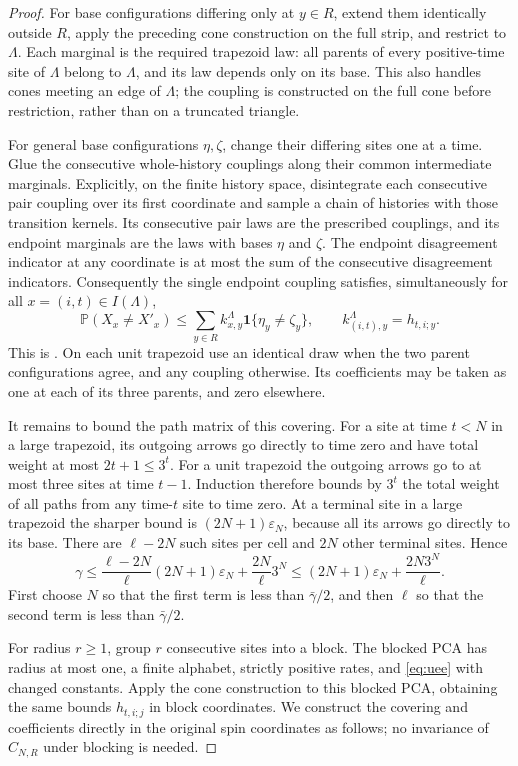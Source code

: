 \documentclass[11pt]{article}
\theoremstyle{plain}
\theoremstyle{definition}
\theoremstyle{remark}
\newcommand{\Prob}{\mathbb{P}}
\begin{document}
\begin{proof}
For base configurations differing only at $y\in R$, extend them identically outside $R$, apply the preceding cone construction on the full strip, and restrict to $\Lambda$. Each marginal is the required trapezoid law: all parents of every positive-time site of $\Lambda$ belong to $\Lambda$, and its law depends only on its base. This also handles cones meeting an edge of $\Lambda$; the coupling is constructed on the full cone before restriction, rather than on a truncated triangle.

For general base configurations $\eta,\zeta$, change their differing sites one at a time. Glue the consecutive whole-history couplings along their common intermediate marginals. Explicitly, on the finite history space, disintegrate each consecutive pair coupling over its first coordinate and sample a chain of histories with those transition kernels. Its consecutive pair laws are the prescribed couplings, and its endpoint marginals are the laws with bases $\eta$ and $\zeta$. The endpoint disagreement indicator at any coordinate is at most the sum of the consecutive disagreement indicators. Consequently the single endpoint coupling satisfies, simultaneously for all $x=(i,t)\in I(\Lambda)$,
\[
 \Prob(X_x\ne X'_x)
 \le\sum_{y\in R}k^\Lambda_{x,y}
             \mathbf1\{\eta_y\ne\zeta_y\},
 \qquad k^\Lambda_{(i,t),y}=h_{t,i;y}.
\]
This is \cite[eq.~(3-3)]{MS91}. On each unit trapezoid use an identical draw when the two parent configurations agree, and any coupling otherwise. Its coefficients may be taken as one at each of its three parents, and zero elsewhere.

It remains to bound the path matrix of this covering. For a site at time $t<N$ in a large trapezoid, its outgoing arrows go directly to time zero and have total weight at most $2t+1\le3^t$. For a unit trapezoid the outgoing arrows go to at most three sites at time $t-1$. Induction therefore bounds by $3^t$ the total weight of all paths from any time-$t$ site to time zero. At a terminal site in a large trapezoid the sharper bound is $(2N+1)\varepsilon_N$, because all its arrows go directly to its base. There are $\ell-2N$ such sites per cell and $2N$ other terminal sites. Hence
\[
 \gamma\le
 \frac{\ell-2N}{\ell}(2N+1)\varepsilon_N
       +\frac{2N}{\ell}3^N
 \le(2N+1)\varepsilon_N+\frac{2N3^N}{\ell}.
\]
First choose $N$ so that the first term is less than $\bar\gamma/2$, and then $\ell$ so that the second term is less than $\bar\gamma/2$.

For radius $r\ge1$, group $r$ consecutive sites into a block. The blocked PCA has radius at most one, a finite alphabet, strictly positive rates, and \eqref{eq:uee} with changed constants. Apply the cone construction to this blocked PCA, obtaining the same bounds $h_{t,i;j}$ in block coordinates. We construct the covering and coefficients directly in the original spin coordinates as follows; no invariance of $C_{N,R}$ under blocking is needed.


\end{proof}
\end{document}
